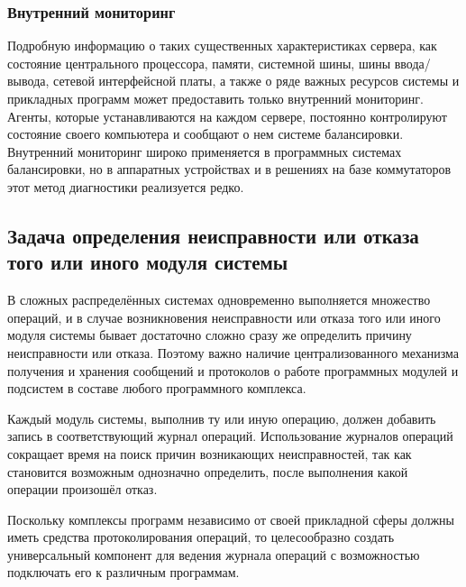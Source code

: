 \subsubsection{Внутренний мониторинг}

Подробную информацию о таких существенных характеристиках сервера, как состояние центрального процессора, памяти, системной шины, шины ввода/вывода, сетевой интерфейсной платы, а также о ряде важных ресурсов системы и прикладных программ  может предоставить только внутренний мониторинг. Агенты, которые устанавливаются на каждом сервере, постоянно контролируют состояние своего компьютера и сообщают о нем системе балансировки. Внутренний мониторинг широко применяется в программных системах балансировки, но в аппаратных устройствах и в решениях на базе коммутаторов этот метод диагностики реализуется редко.

\subsection{Задача определения неисправности или отказа того или иного модуля системы}

В сложных распределённых системах одновременно выполняется множество операций, и в случае возникновения неисправности или отказа того или иного модуля системы бывает достаточно сложно сразу же определить причину неисправности или отказа. Поэтому важно наличие централизованного механизма получения и хранения сообщений и протоколов о работе программных модулей и подсистем в составе любого программного комплекса.

Каждый модуль системы, выполнив ту или иную операцию, должен добавить запись в соответствующий журнал операций. Использование журналов операций сокращает время на поиск причин возникающих неисправностей, так как становится возможным однозначно определить, после выполнения какой операции произошёл отказ.

Поскольку комплексы программ независимо от своей прикладной сферы должны иметь средства протоколирования операций, то целесообразно создать универсальный компонент для ведения журнала операций с возможностью подключать его к различным программам.

\newpage
